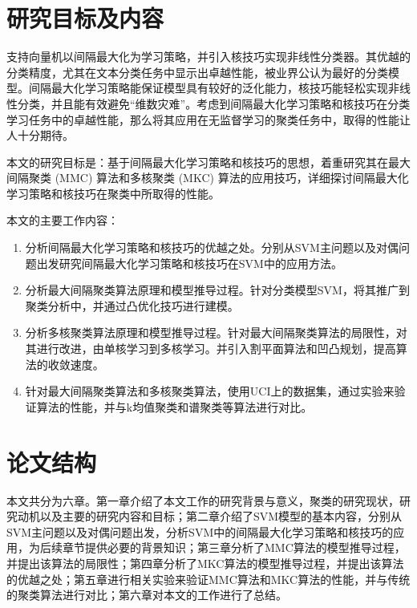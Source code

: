 \section{研究目标及内容}
支持向量机以间隔最大化为学习策略，并引入核技巧实现非线性分类器。其优越的分类精度，尤其在文本分类任务中显示出卓越性能，被业界公认为最好的分类模型。间隔最大化学习策略能保证模型具有较好的泛化能力，核技巧能轻松实现非线性分类，并且能有效避免“维数灾难”。考虑到间隔最大化学习策略和核技巧在分类学习任务中的卓越性能，那么将其应用在无监督学习的聚类任务中，取得的性能让人十分期待。

本文的研究目标是：基于间隔最大化学习策略和核技巧的思想，着重研究其在最大间隔聚类 (MMC) 算法和多核聚类 (MKC) 算法的应用技巧，详细探讨间隔最大化学习策略和核技巧在聚类中所取得的性能。

本文的主要工作内容：
\begin{enumerate}[fullwidth,itemindent=24pt]
  \item 分析间隔最大化学习策略和核技巧的优越之处。分别从SVM主问题以及对偶问题出发研究间隔最大化学习策略和核技巧在SVM中的应用方法。
  \item 分析最大间隔聚类算法原理和模型推导过程。针对分类模型SVM，将其推广到聚类分析中，并通过凸优化技巧进行建模。
  \item 分析多核聚类算法原理和模型推导过程。针对最大间隔聚类算法的局限性，对其进行改进，由单核学习到多核学习。并引入割平面算法和凹凸规划，提高算法的收敛速度。
  \item 针对最大间隔聚类算法和多核聚类算法，使用UCI上的数据集，通过实验来验证算法的性能，并与k均值聚类和谱聚类等算法进行对比。
\end{enumerate}
  
\section{论文结构}
本文共分为六章。第一章介绍了本文工作的研究背景与意义，聚类的研究现状，研究动机以及主要的研究内容和目标；第二章介绍了SVM模型的基本内容，分别从SVM主问题以及对偶问题出发，分析SVM中的间隔最大化学习策略和核技巧的应用，为后续章节提供必要的背景知识；第三章分析了MMC算法的模型推导过程，并提出该算法的局限性；第四章分析了MKC算法的模型推导过程，并提出该算法的优越之处；第五章进行相关实验来验证MMC算法和MKC算法的性能，并与传统的聚类算法进行对比；第六章对本文的工作进行了总结。